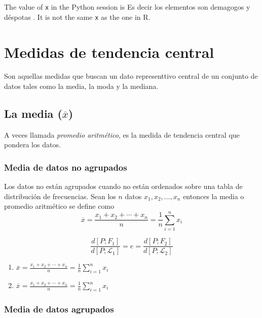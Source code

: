 \documentclass[10pt,]{krantz}
\providecommand{\tightlist}{%
  \setlength{\itemsep}{0pt}\setlength{\parskip}{0pt}}
\theoremstyle{definition}
\theoremstyle{definition}
\theoremstyle{definition}
\theoremstyle{definition}
\theoremstyle{remark}
\begin{document}
The value of \texttt{x} in the Python session is Es decir los elementos son demagogos y déspotas .
It is not the same \texttt{x} as the one in R.

\hypertarget{medidas-de-tendencia-central}{%
\chapter{Medidas de tendencia central}\label{medidas-de-tendencia-central}}

Son aquellas medidas que buscan un dato representtivo central de un conjunto de datos tales como la media, la moda y la mediana.

\hypertarget{la-media-overlinex}{%
\section{\texorpdfstring{La media (\(\overline{x}\))}{La media (\textbackslash{}overline\{x\})}}\label{la-media-overlinex}}

A veces llamada \emph{promedio aritmético}, es la medida de tendencia central que pondera los datos.

\hypertarget{media-de-datos-no-agrupados}{%
\subsection{Media de datos no agrupados}\label{media-de-datos-no-agrupados}}

Los datos no están agrupados cuando no están ordenados sobre una tabla de distribución de frecuencias. Sean los \(n\) datos \(x_1, x_2, \ldots, x_n\) entonces la media o promedio aritmético se define como
\[ \label{eq:w1} 
\overline{x}=\frac{x_1+x_2+\cdots+x_n}{n}=\frac{1}{n}\sum_{i=1}^nx_i 
\]

\[ 
\label{eq:ww}
\frac{d\left[P; F_1\right]}{d\left[P; \mathcal{L}_1\right]}=e=\frac{d\left[P; F_2\right]}{d\left[P; \mathcal{L}_2\right]}
\]

\begin{enumerate}
\def\labelenumi{\arabic{enumi}.}
\tightlist
\item
  \(\overline{x}=\frac{x_1+x_2+\cdots+x_n}{n}=\frac{1}{n}\sum_{i=1}^nx_i\)
\item
  \(\overline{x}=\frac{x_1+x_2+\cdots+x_n}{n}=\frac{1}{n}\sum_{i=1}^nx_i\)
\end{enumerate}

\hypertarget{media-de-datos-agrupados}{%
\subsection{Media de datos agrupados}\label{media-de-datos-agrupados}}
\end{document}
